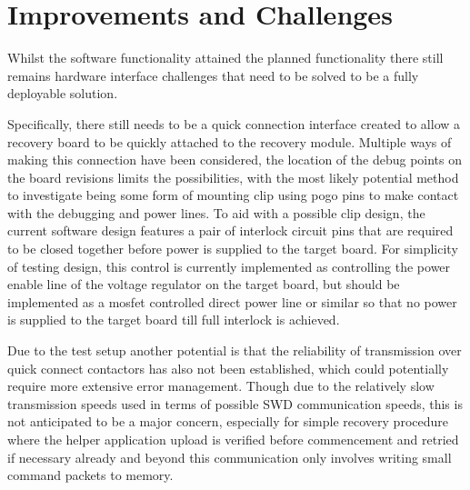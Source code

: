 \clearpage%
\vspace{21.5pt}
\chapter{Improvements and Challenges}

Whilst the software functionality attained the planned functionality there still remains hardware interface challenges that need to be solved to be a fully deployable solution.

Specifically, there still needs to be a quick connection interface created to allow a recovery board to be quickly attached to the recovery module. Multiple ways of making this connection have been considered, the location of the debug points on the board revisions limits the possibilities, with the most likely potential method to investigate being some form of mounting clip using pogo pins to make contact with the debugging and power lines.
To aid with a possible clip design, the current software design features a pair of interlock circuit pins that are required to be closed together before power is supplied to the target board. For simplicity of testing design, this control is currently implemented as controlling the power enable line of the voltage regulator on the target board, but should  be implemented as a mosfet controlled direct power line or similar so that no power is supplied to the target board till full interlock is achieved.

Due to the test setup another potential is that the reliability of transmission over quick connect contactors has also not been established, which could potentially require more extensive error management. Though due to the relatively slow transmission speeds used in terms of possible SWD communication speeds, this is not anticipated to be a major concern, especially for simple recovery procedure where the helper application upload is verified before commencement and retried if necessary already and beyond this communication only involves writing small command packets to memory.